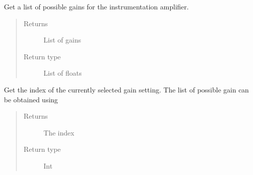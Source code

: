 \documentclass[letterpaper,10pt,english]{sphinxmanual}
\begin{document}
\begin{fulllineitems}
\begin{fulllineitems}
\begin{quote}
\begin{description}
\end{description}\end{quote}

\end{fulllineitems}


\begin{fulllineitems}
\label{\detokenize{index:TiePieLCR_settings.TiePieLCR_settings.get_gain_name_list}}
\sphinxAtStartPar
Get a list of possible gains for the instrumentation amplifier.
\begin{quote}\begin{description}
\item[{Returns}] \leavevmode
\sphinxAtStartPar
List of gains

\item[{Return type}] \leavevmode
\sphinxAtStartPar
List of floats

\end{description}\end{quote}

\end{fulllineitems}


\begin{fulllineitems}
\label{\detokenize{index:TiePieLCR_settings.TiePieLCR_settings.get_gain_setting}}
\sphinxAtStartPar
Get the index of the currently selected gain setting. The list of possible gain can be obtained using {\hyperref[\detokenize{index:TiePieLCR_settings.TiePieLCR_settings.get_gain_name_list}]{}}
\begin{quote}\begin{description}
\item[{Returns}] \leavevmode
\sphinxAtStartPar
The index

\item[{Return type}] \leavevmode
\sphinxAtStartPar
Int

\end{description}\end{quote}


\end{fulllineitems}
\end{fulllineitems}
\end{document}
